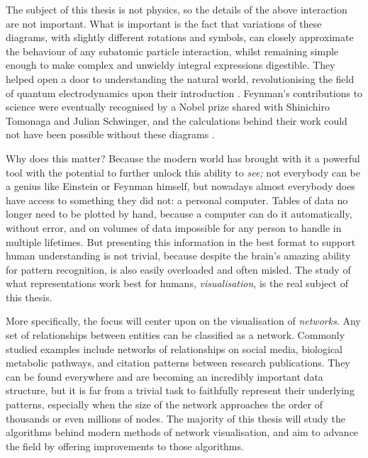 The subject of this thesis is not physics, so the details of the above interaction are not important. What is important is the fact that variations of these diagrams, with slightly different rotations and symbols, can closely approximate the behaviour of any subatomic particle interaction, whilst remaining simple enough to make complex and unwieldy integral expressions digestible. They helped open a door to understanding the natural world, revolutionising the field of quantum electrodynamics upon their introduction \cite{Kaiser2005}.
Feynman's contributions to science were eventually recognised by a Nobel prize shared with Shinichiro Tomonaga and Julian Schwinger, and the calculations behind their work could not have been possible without these diagrams \cite{Kaiser2009}.

Why does this matter? Because the modern world has brought with it a powerful tool with the potential to further unlock this ability to \emph{see;}
not everybody can be a genius like Einstein or Feynman himself, but nowadays almost everybody does have access to something they did not: a personal computer.
Tables of data no longer need to be plotted by hand, because a computer can do it automatically, without error, and on volumes of data impossible for any person to handle in multiple lifetimes.
But presenting this information in the best format to support human understanding is not trivial, because despite the brain's amazing ability for pattern recognition, is also easily overloaded and often misled.
The study of what representations work best for humans, \emph{visualisation}, is the real subject of this thesis.

More specifically, the focus will center upon on the visualisation of \emph{networks}. 
Any set of relationships between entities can be classified as a network. Commonly studied examples include networks of relationships on social media, biological metabolic pathways, and citation patterns between research publications. They can be found everywhere and are becoming an incredibly important data structure, but it is far from a trivial task to faithfully represent their underlying patterns, especially when the size of the network approaches the order of thousands or even millions of nodes. The majority of this thesis will study the algorithms behind modern methods of network visualisation, and aim to advance the field by offering improvements to those algorithms.

